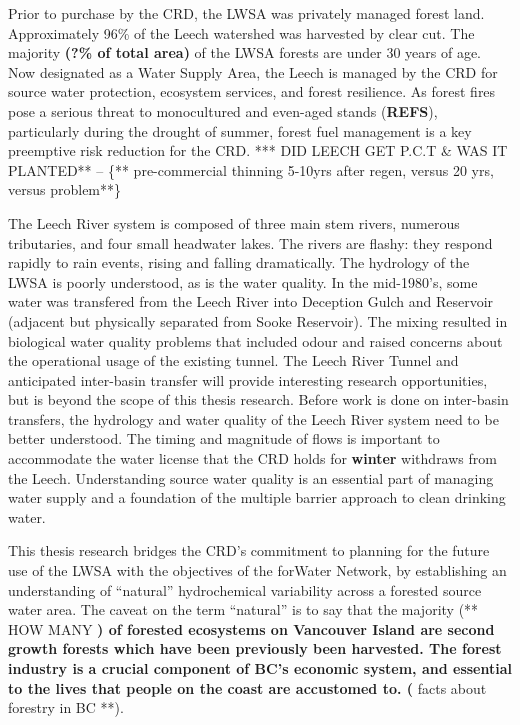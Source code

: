 \documentclass[]{article}
\begin{document}
Prior to purchase by the CRD, the LWSA was privately managed forest
land. Approximately 96\% of the Leech watershed was harvested by clear
cut. The majority \textbf{(?\% of total area)} of the LWSA forests are
under 30 years of age. Now designated as a Water Supply Area, the Leech
is managed by the CRD for source water protection, ecosystem services,
and forest resilience. As forest fires pose a serious threat to
monocultured and even-aged stands (\textbf{REFS}), particularly during
the drought of summer, forest fuel management is a key preemptive risk
reduction for the CRD. *** DID LEECH GET P.C.T \& WAS IT PLANTED** --
\{** pre-commercial thinning 5-10yrs after regen, versus 20 yrs, versus
problem**\}

The Leech River system is composed of three main stem rivers, numerous
tributaries, and four small headwater lakes. The rivers are flashy: they
respond rapidly to rain events, rising and falling dramatically. The
hydrology of the LWSA is poorly understood, as is the water quality. In
the mid-1980's, some water was transfered from the Leech River into
Deception Gulch and Reservoir (adjacent but physically separated from
Sooke Reservoir). The mixing resulted in biological water quality
problems that included odour and raised concerns about the operational
usage of the existing tunnel. The Leech River Tunnel and anticipated
inter-basin transfer will provide interesting research opportunities,
but is beyond the scope of this thesis research. Before work is done on
inter-basin transfers, the hydrology and water quality of the Leech
River system need to be better understood. The timing and magnitude of
flows is important to accommodate the water license that the CRD holds
for \textbf{winter} withdraws from the Leech. Understanding source water
quality is an essential part of managing water supply and a foundation
of the multiple barrier approach to clean drinking water.

This thesis research bridges the CRD's commitment to planning for the
future use of the LWSA with the objectives of the forWater Network, by
establishing an understanding of ``natural'' hydrochemical variability
across a forested source water area. The caveat on the term ``natural''
is to say that the majority (** HOW MANY \textbf{) of forested
ecosystems on Vancouver Island are second growth forests which have been
previously been harvested. The forest industry is a crucial component of
BC's economic system, and essential to the lives that people on the
coast are accustomed to. (} facts about forestry in BC **).
\end{document}
